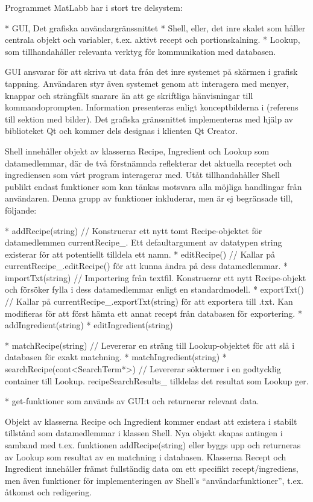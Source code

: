 Programmet MatLabb har i stort tre delsystem:

 * GUI, Det grafiska användargränssnittet
 * Shell, eller, det inre skalet som håller centrala objekt och variabler, t.ex. aktivt recept och portionskalning.
 * Lookup, som tillhandahåller relevanta verktyg för kommunikation med databasen.

GUI ansvarar för att skriva ut data från det inre systemet på skärmen i grafisk tappning. Användaren styr även systemet genom att interagera med menyer, knappar och strängfält snarare än att ge skriftliga hänvisningar till kommandoprompten. Information presenteras enligt konceptbilderna i (referens till sektion med bilder). Det grafiska gränssnittet implementeras med hjälp av biblioteket Qt och kommer dels designas i klienten Qt Creator.

Shell innehåller objekt av klasserna Recipe, Ingredient och Lookup som datamedlemmar, där de två förstnämnda reflekterar det aktuella receptet och ingrediensen som vårt program interagerar med. Utåt tillhandahåller Shell publikt endast funktioner som kan tänkas motsvara alla möjliga handlingar från användaren. Denna grupp av funktioner inkluderar, men är ej begränsade till, följande:

 * addRecipe(string) // Konstruerar ett nytt tomt Recipe-objektet för datamedlemmen currentRecipe\_. Ett defaultargument av datatypen string existerar för att potentiellt tilldela ett namn.
 * editRecipe() // Kallar på currentRecipe\_.editRecipe() för att kunna ändra på dess datamedlemmar.
 * importTxt(string) // Importering från textfil. Konstruerar ett nytt Recipe-objekt och försöker fylla i dess datamedlemmar enligt en standardmodell.
 * exportTxt() // Kallar på currentRecipe\_.exportTxt(string) för att exportera till .txt. Kan modifieras för att först hämta ett annat recept från databasen för exportering.
 * addIngredient(string)
 * editIngredient(string)

 * matchRecipe(string) // Levererar en sträng till Lookup-objektet för att slå i databasen för exakt matchning.
 * matchIngredient(string)
 * searchRecipe(cont<SearchTerm*>) // Levererar söktermer i en godtycklig container till Lookup. recipeSearchResults\_ tilldelas det resultat som Lookup ger.

 * get-funktioner som används av GUI:t och returnerar relevant data.

Objekt av klasserna Recipe och Ingredient kommer endast att existera i stabilt tillstånd som datamedlemmar i klassen Shell. Nya objekt skapas antingen i samband med t.ex. funktionen addRecipe(string) eller byggs upp och returneras av Lookup som resultat av en matchning i databasen. Klasserna Recept och Ingredient innehåller främst fullständig data om ett specifikt recept/ingrediens, men även funktioner för implementeringen av Shell's ``användarfunktioner'', t.ex. åtkomst och redigering.

